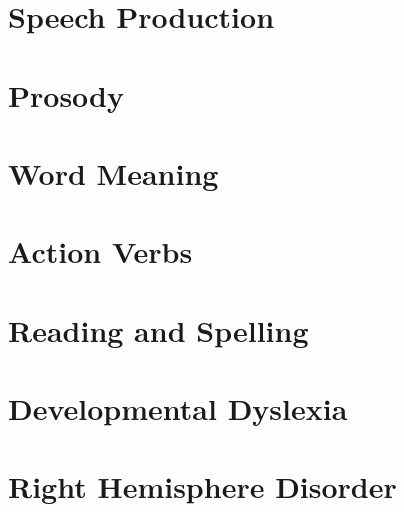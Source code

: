 \documentclass[
]{article}
\begin{document}
\hypertarget{speech-production}{%
\section{Speech Production}\label{speech-production}}

\hypertarget{prosody}{%
\section{Prosody}\label{prosody}}

\hypertarget{word-meaning}{%
\section{Word Meaning}\label{word-meaning}}

\hypertarget{action-verbs}{%
\section{Action Verbs}\label{action-verbs}}

\hypertarget{reading-and-spelling}{%
\section{Reading and Spelling}\label{reading-and-spelling}}

\hypertarget{developmental-dyslexia}{%
\section{Developmental Dyslexia}\label{developmental-dyslexia}}

\hypertarget{right-hemisphere-disorder}{%
\section{Right Hemisphere Disorder}\label{right-hemisphere-disorder}}

  
\end{document}
